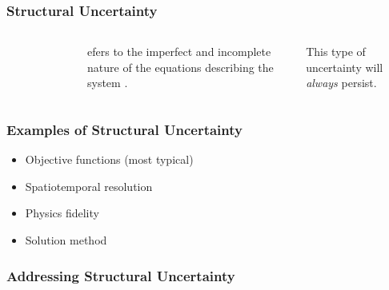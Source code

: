 \begin{frame}
    \frametitle{Structural Uncertainty}

    \begin{columns}
        \column[t]{4cm}
        \begin{figure}
            \centering
        \end{figure}

        \column[t]{6cm}
        \begin{definition}efers to the imperfect and incomplete nature of the equations describing the system \cite{decarolis_using_2011}.
        \end{definition}
        
        This type of uncertainty will \textit{always} persist.
    \end{columns}

\end{frame}

\begin{frame}
    \frametitle{Examples of Structural Uncertainty}

    \begin{itemize}
        \item Objective functions (most typical)\pause
        \item Spatiotemporal resolution\pause
        \item Physics fidelity\pause
        \item Solution method
    \end{itemize}

\end{frame}

\begin{frame}
    \frametitle{Addressing Structural Uncertainty}

    

\end{frame}